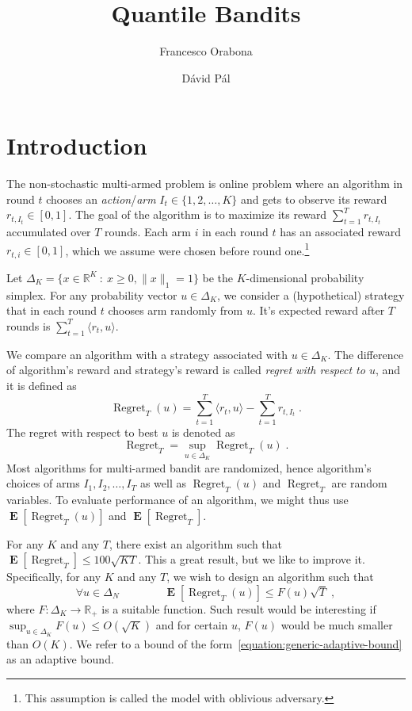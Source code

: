 \documentclass{article}
\newcommand{\R}{\mathbb{R}}
\newcommand{\norm}[1]{\|#1\|}
\DeclareMathOperator{\Regret}{Regret}
\DeclareMathOperator{\Exp}{\mathbf{E}}
\begin{document}
\title{Quantile Bandits}
\author{Francesco Orabona \and D\'avid P\'al}

\maketitle

\section{Introduction}

The non-stochastic multi-armed problem is online problem where an algorithm in
round $t$ chooses an \emph{action}/\emph{arm} $I_t \in \{1,2,\dots,K\}$ and
gets to observe its reward $r_{t,I_t} \in [0,1]$. The goal of the algorithm is
to maximize its reward $\sum_{t=1}^T r_{t,I_t}$ accumulated over $T$ rounds.
Each arm $i$ in each round $t$ has an associated reward $r_{t,i} \in [0,1]$,
which we assume were chosen before round one.\footnote{This assumption
is called the model with oblivious adversary.}

Let $\Delta_K = \{ x \in \R^K ~:~ x \ge 0, \norm{x}_1 = 1 \}$ be the
$K$-dimensional probability simplex. For any probability vector $u \in
\Delta_K$, we consider a (hypothetical) strategy that in each round $t$ chooses
arm randomly from $u$. It's expected reward after $T$ rounds is $\sum_{t=1}^T
\langle r_t, u \rangle$.

We compare an algorithm with a strategy associated with $u \in \Delta_K$.
The difference of algorithm's reward and strategy's reward is called \emph{regret
with respect to $u$}, and it is defined as
$$
\Regret_T(u) = \sum_{t=1}^T \langle r_t, u \rangle - \sum_{t=1}^T r_{t,I_t} \; .
$$
The regret with respect to best $u$ is denoted as
$$
\Regret_T =  \sup_{u \in \Delta_K} \Regret_T(u) \; .
$$
Most algorithms for multi-armed bandit are randomized, hence algorithm's
choices of arms $I_1, I_2, \dots, I_T$ as well as $\Regret_T(u)$ and
$\Regret_T$ are random variables. To evaluate performance of an algorithm,
we might thus use $\Exp[\Regret_T(u)]$ and $\Exp[\Regret_T]$.

For any $K$ and any $T$, there exist an algorithm such that $\Exp[\Regret_T] \le
100 \sqrt{KT}$. This a great result, but we like to improve it. Specifically,
for any $K$ and any $T$, we wish to design an algorithm such that
\begin{equation}
\label{equation:generic-adaptive-bound}
\forall u \in \Delta_N \qquad \qquad \Exp[\Regret_T(u)] \le F(u) \sqrt{T} \; ,
\end{equation}
where $F:\Delta_K \to \R_+$ is a suitable function. Such result would be
interesting if $\sup_{u \in \Delta_K} F(u) \le O(\sqrt{K})$ and for certain
$u$, $F(u)$ would be much smaller than $O(K)$. We refer to a bound of the
form~\eqref{equation:generic-adaptive-bound} as an adaptive bound.
\end{document}
